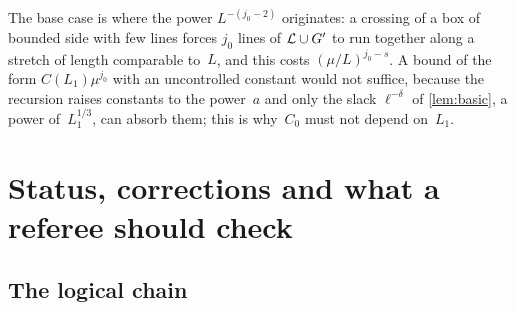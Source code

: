 \documentclass[11pt,letterpaper]{article}
\begin{document}
\begin{remark}
The base case is where the power $L^{-(j_0-2)}$ originates: a crossing of a box of bounded side with few lines forces $j_0$ lines of $\mathcal L\cup G'$ to run together along a stretch of length comparable to~$L$, and this costs $(\mu/L)^{j_0-s}$. A bound of the form $C(L_1)\mu^{j_0}$ with an uncontrolled constant would not suffice, because the recursion raises constants to the power~$a$ and only the slack $\ell^{-\delta}$ of \cref{lem:basic}, a power of~$L_1^{1/3}$, can absorb them; this is why~$C_0$ must not depend on~$L_1$.
\end{remark}


\section{Status, corrections and what a referee should check}
\label{sec:status}

\subsection{The logical chain}
\end{document}
